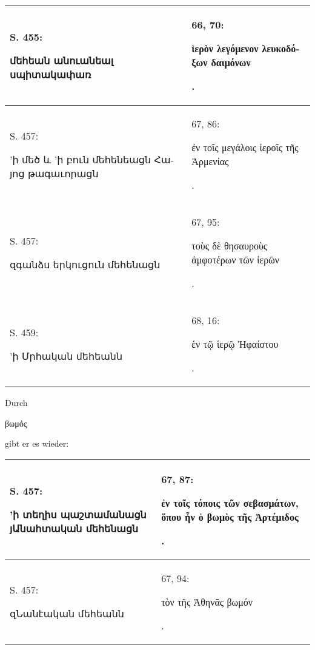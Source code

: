 \documentclass{article}
\begin{document}
{\begin{table}[H]
\begin{tabular}{p{45mm}|p{45mm}}
        S. 455: \begin{armenian}մեհեան անուանեալ սպիտակափառ\end{armenian} & 66, 70: \begin{greek}ἱερὸν λεγόμενον λευκοδόξων δαιμόνων\end{greek}.   \\ \hline
        S. 457: \begin{armenian}'ի մեծ և 'ի բուն մեհենեացն Հայոց թագաւորացն\end{armenian} & 67, 86: \begin{greek}ἐν τοῖς μεγάλοις ἱεροῖς τῆς Ἀρμενίας\end{greek}.   \\ \hline
        S. 457: \begin{armenian}զգանձս երկուցուն մեհենացն\end{armenian} & 67, 95: \begin{greek}τοὺς δὲ θησαυροὺς ἀμφοτέρων τῶν ἱερῶν\end{greek}.   \\ \hline
        S. 459: \begin{armenian}'ի Մրհական մեհեանն\end{armenian} & 68, 16: \begin{greek}ἑν τῷ ἱερῷ Ἡφαίστου\end{greek}. \\ \hline
    \end{tabular}
\end{table}
\hspace*{5mm}Durch \begin{greek}βωμός\end{greek} gibt er es wieder:  
\begin{table}[H]
    \centering
    \tiny
    \begin{tabular}{p{45mm}|p{45mm}}
    \hline
        S. 457: \begin{armenian}'ի տեղիս պաշտամանացն յԱնահտական մեհենացն\end{armenian} & 67, 87: \begin{greek}ἐν τοῖς τόποις τῶν σεβασμάτων, ὅπου ἦν ὁ βωμὸς τῆς Ἀρτέμιδος\end{greek}.   \\ \hline
        S. 457: \begin{armenian}զՆանէական մեհեանն\end{armenian} & 67, 94: \begin{greek}τὸν τῆς Ἀθηνᾶς βωμόν\end{greek}.   \\ \hline

\end{tabular}
\end{table}}
\end{document}
